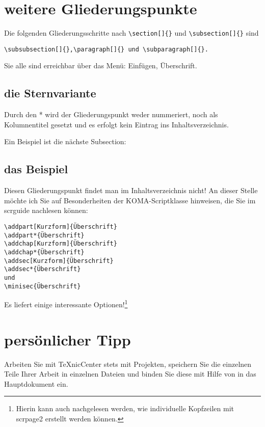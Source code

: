\documentclass[a4paper,%
twoside,							%
headsepline=true,				%
footsepline=true,				%
headings=normal,
listof=totoc,					%
bibliography=totoc,			%
listof=entryprefix,
]
{scrartcl}
\begin{document}
\section{weitere Gliederungspunkte}
Die folgenden Gliederungsschritte nach \verb#\section[]{}# und \verb#\subsection[]{}# sind 
\begin{verbatim}
\subsubsection[]{},\paragraph[]{} und \subparagraph[]{}.
\end{verbatim}

Sie alle sind erreichbar über das Menü: Einfügen, Überschrift.

\subsection{die Sternvariante}
Durch den * wird der Gliederungspunkt weder nummeriert, noch als Kolumnentitel gesetzt und es erfolgt kein Eintrag
ins Inhaltsverzeichnis.

Ein Beispiel ist die nächste Subsection:

\subsection*{das Beispiel}
Diesen Gliederungspunkt findet man im Inhaltsverzeichnis nicht!
An dieser Stelle möchte ich Sie auf Besonderheiten der KOMA-Scriptklasse hinweisen, die Sie im scrguide nachlesen können:
\begin{verbatim}
\addpart[Kurzform]{Überschrift}
\addpart*{Überschrift}
\addchap[Kurzform]{Überschrift}
\addchap*{Überschrift}
\addsec[Kurzform]{Überschrift}
\addsec*{Überschrift}
und
\minisec{Überschrift}
\end{verbatim}
Es liefert einige interessante Optionen!\footnote{Hierin kann auch nachgelesen werden, wie individuelle Kopfzeilen mit scrpage2 erstellt werden können.}

\section{persönlicher Tipp}
Arbeiten Sie mit TeXnicCenter stets mit Projekten, speichern Sie die einzelnen Teile Ihrer Arbeit in einzelnen Dateien und binden Sie diese mit Hilfe von \verb## in das Hauptdokument ein.
\end{document}
